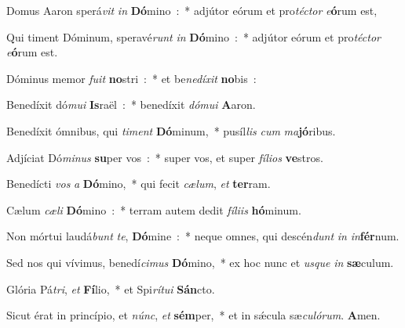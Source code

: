 \item Domus Aaron sperá\emph{vit} \emph{in} \textbf{Dó}\-mino~:~* adjútor eórum et pro\emph{té}\-\emph{ctor} \emph{e}\-\textbf{ó}\-rum est,
\item Qui timent Dóminum, speravé\emph{runt} \emph{in} \textbf{Dó}\-mino~:~* adjútor eórum et pro\emph{té}\-\emph{ctor} \emph{e}\-\textbf{ó}\-rum est.
\item Dóminus memor \emph{fu}\-\emph{it} \textbf{no}\-stri~:~* et be\emph{ne}\-\emph{dí}\-\emph{xit} \textbf{no}bis~:
\item Benedíxit dó\emph{mu}\-\emph{i} \textbf{Is}\-raël~:~* benedíxit \emph{dó}\-\emph{mu}\-\emph{i} \textbf{A}aron.
\item Benedíxit ómnibus, qui \emph{ti}\-\emph{ment} \textbf{Dó}\-minum,~* pu\-síl\-\emph{lis} \emph{cum} \emph{ma}\textbf{jó}ribus.
\item Adjíciat Dó\emph{mi}\-\emph{nus} \textbf{su}\-per vos~:~* super vos, et super \emph{fí}\-\emph{li}\-\emph{os} \textbf{ve}stros.
\item Benedícti \emph{vos} \emph{a} \textbf{Dó}\-mino,~* qui fecit \emph{cæ}\-\emph{lum}, \emph{et} \textbf{ter}ram.
\item Cælum \emph{cæ}\-\emph{li} \textbf{Dó}\-mino~:~* terram autem dedit \emph{fí}\-\emph{li}\-\emph{is} \textbf{hó}minum.
\item Non mórtui laudá\emph{bunt} \emph{te}, \textbf{Dó}\-mine~:~* neque omnes, qui descén\emph{dunt} \emph{in} \emph{in}\textbf{fér}num.
\item Sed nos qui vívimus, benedí\emph{ci}\-\emph{mus} \textbf{Dó}\-mino,~* ex hoc nunc et \emph{us}\-\emph{que} \emph{in} \textbf{sæ}culum.
\item Glória Pá\emph{tri}, \emph{et} \textbf{Fí}\-lio,~* et Spi\emph{rí}\-\emph{tu}\-\emph{i} \textbf{Sán}cto.
\item Sicut érat in princípio, et \emph{núnc}, \emph{et} \textbf{sém}\-per,~* et in sǽcula sæ\emph{cu}\-\emph{ló}\-\emph{rum}. \textbf{A}men.
